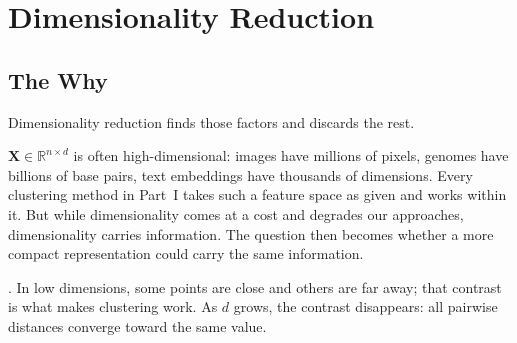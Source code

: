 







\chapter{Dimensionality Reduction}


\section{The Why}

Dimensionality reduction finds those factors and discards the rest.







 $\mathbf{X} \in \mathbb{R}^{n \times d}$ is often high-dimensional: 
images have millions of pixels, genomes have billions of base pairs, text embeddings have thousands of dimensions.
Every clustering method in Part~I takes such a feature space as given and works within it.
But while dimensionality comes at a cost and degrades our approaches, dimensionality carries information. 
The question then becomes whether a more compact representation could carry the same information.


.
In low dimensions, some points are close and others are far away; that contrast is what makes clustering work.
As $d$ grows, the contrast disappears: all pairwise distances converge toward the same value.



